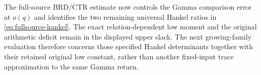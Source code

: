 The full-source BRD/CTR estimate now controls the Gamma
comparison error at $o(q)$ and identifies the two remaining
universal Hankel ratios in \eqref{eq:fullsource-hankel}.
The exact relation-dependent low moment and the original
arithmetic deficit remain in the displayed upper slack.
The next growing-family evaluation therefore concerns
those specified Hankel determinants together with their
retained original low constant, rather than another
fixed-input trace approximation to the same Gamma return.